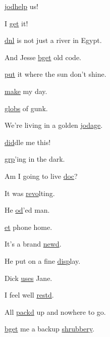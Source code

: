 \begin{center}

	\hyperlink{il:jodhelp}{jodhelp} us!
	
	I \hyperlink{il:get}{get} it!

   \hyperlink{il:dnl}{dnl} is not just a river in Egypt.
   
   And Jesse \hyperlink{il:bget}{bget} old code.
	
	\hyperlink{il:put}{put} it where the sun don't shine.
	
	\hyperlink{il:make}{make} my day.

   \hyperlink{il:globs}{globs} of gunk.
	
	We're living in a golden \hyperlink{il:jodage}{jodage}.
	
	\hyperlink{il:did}{did}dle me this!
	
	\hyperlink{il:grp}{grp}'ing in the dark.
	
	Am I going to live \hyperlink{il:doc}{doc}?
	
	It was \hyperlink{il:revo}{revo}lting.
	
	He \hyperlink{il:od}{od}'ed man.
	
	\hyperlink{il:et}{et} phone home.
	
	It's a brand \hyperlink{il:newd}{newd}.
	
	He put on a fine \hyperlink{il:disp}{disp}lay.
	
	Dick \hyperlink{il:uses}{uses} Jane.
	
	I feel well \hyperlink{il:restd}{restd}.
	
	All \hyperlink{il:packd}{packd} up and nowhere to go.
	
	\hyperlink{il:bget}{bget} me a backup \href{https://www.youtube.com/watch?v=69iB-xy0u4A}{shrubbery}.
\end{center}

\normalsize	
\normalfont	

%

%

	
